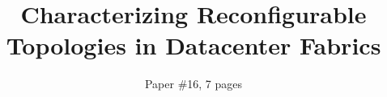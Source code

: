 \documentclass{hotnets15}
\begin{document}
\title{Characterizing Reconfigurable Topologies in Datacenter Fabrics}

\author{\alignauthor Paper \#16, 7 pages}


\maketitle













\end{document}
